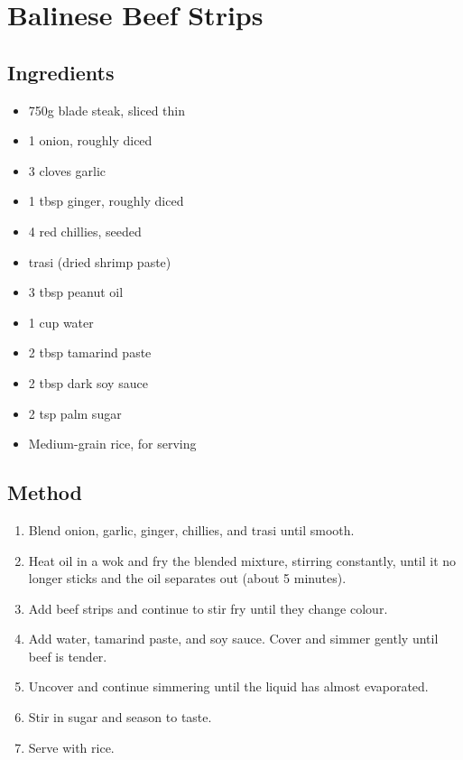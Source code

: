 \clearpage
\section{Balinese Beef Strips}


\subsection{Ingredients}

\begin{itemize}
    \item 750g blade steak, sliced thin
    \item 1 onion, roughly diced
    \item 3 cloves garlic
    \item 1 tbsp ginger, roughly diced
    \item 4 red chillies, seeded
    \item {} trasi (dried shrimp paste)
    \item 3 tbsp peanut oil
    \item 1 cup water
    \item 2 tbsp tamarind paste
    \item 2 tbsp dark soy sauce
    \item 2 tsp palm sugar
    \item Medium-grain rice, for serving
\end{itemize}

\subsection{Method}

\begin{enumerate}
    \item Blend onion, garlic, ginger, chillies, and trasi until smooth.
    \item Heat oil in a wok and fry the blended mixture, stirring constantly, until it no longer sticks and the oil separates out (about 5 minutes).
    \item Add beef strips and continue to stir fry until they change colour.
    \item Add water, tamarind paste, and soy sauce. Cover and simmer gently until beef is tender.
    \item Uncover and continue simmering until the liquid has almost evaporated.
    \item Stir in sugar and season to taste.
    \item Serve with rice.
\end{enumerate}
